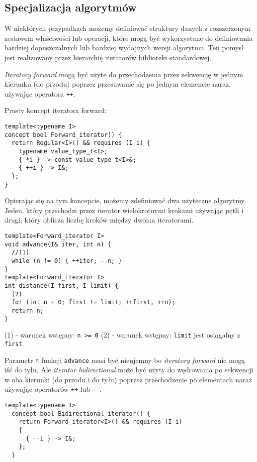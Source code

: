 \documentclass[11pt, a4paper]{article}
\begin{document}
\lstset{language=C++}

\subsection{Specjalizacja algorytmów}

W niektórych przypadkach możemy definiować struktury danych z rozszerzonym zestawem właściwości lub operacji, które mogą być wykorzystane do definiowania bardziej dopuszczalnych lub bardziej wydajnych wersji algorytmu. Ten pomysł jest realizowany przez hierarchię iteratorów biblioteki standardowej.

\emph{Iteratory forward} mogą być użyte do przechodzenia przez sekwencję w jednym kierunku (do przodu) poprzez przesuwanie się po jednym elemencie naraz, używając operatora \verb#++#.\newline

\noindent Prosty koncept iteratora forward:\newline

\begin{lstlisting}[frame=single]
template<typename I>
concept bool Forward_iterator() {
  return Regular<I>() && requires (I i) {
    typename value_type_t<I>;
    { *i } -> const value_type_t<I>&;
    { ++i } -> I&;
  };
}
\end{lstlisting}

Opierając się na tym koncepcie, możemy zdefiniować dwa użyteczne algorytmy. Jeden, który przechodzi przez iterator wielokrotnymi krokami używając pętli i drugi, który oblicza liczbę kroków między dwoma iteratorami.

\begin{lstlisting}[frame=single]
template<Forward_iterator I>
void advance(I& iter, int n) {
  //(1)
  while (n != 0) { ++iter; --n; }
}
template<Forward_iterator I>
int distance(I first, I limit) {
  (2)
  for (int n = 0; first != limit; ++first, ++n);
  return n;
}
\end{lstlisting}

(1) - warunek wstępny: \verb#n >= 0# (2) - warunek wstępny: \verb#limit# jest osiągalny z \verb#first#

Parametr \verb#n# funkcji \verb#advance# musi być nieujemny bo \emph{iteratory forward} nie mogą iść do tyłu. Ale \emph{iterator bidirectional} może być użyty do wędrowania po sekwencji w oba kierunki (do przodu i do tyłu) poprzez przechodzenie po elementach naraz używając operatorów \verb#++# lub \verb#--#.

\begin{lstlisting}[frame=single]
template<typename I>
  concept bool Bidirectional_iterator() {
    return Forward_iterator<I>() && requires (I i)
    {
      { --i } -> I&;
    };
  }
\end{lstlisting}
\end{document}
